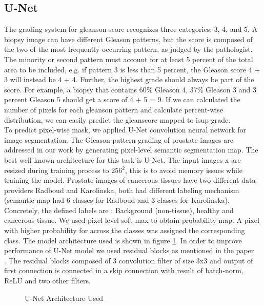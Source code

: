 \documentclass[10pt,twocolumn,letterpaper]{article}
\begin{document}
\subsection{U-Net}
 The grading system for gleanson score recognizes three categories: 3, 4, and 5. A biopsy image can have different Gleason patterns, but the score is composed of the two of the most frequently occurring pattern, as judged by the pathologist. The minority or second pattern must account for at least 5 percent of the total area to be included, e.g. if pattern 3 is less than 5 percent, the Gleason score 4 + 3 will instead be 4 + 4. Further, the highest grade should always be part of the score. For example, a biopsy that contains 60\% Gleason 4, 37\% Gleason 3 and 3 percent Gleason 5 should get a score of 4 + 5 = 9. If we can calculated the number of pixels for each gleanson pattern and calculate percent-wise distribution, we can easily predict the gleanscore mapped to isup-grade. \\
 
To predict pixel-wise mask, we applied U-Net \cite{10.1007/978-3-319-24574-4_28} convolution neural network for image segmentation. The Gleason pattern grading of prostate images are addressed in our work by generating pixel-level semantic segmentation map. The best well known architecture for this task is U-Net. The input images x are resized during training process to $256{^2}$, this is to avoid memory issues while training the model. Prostate images of cancerous tissues have two different data providers Radboud and Karolinska, both had different labeling mechanism (semantic map had 6 classes for Radboud and 3 classes for Karolinska). Concretely, the defined labels are : Background (non-tissue), healthy and cancerous tissue. We used pixel level soft-max to obtain probability map. A pixel with higher probability for across the classes was assigned the corresponding class. The model architecture used is shown in figure \ref{fig:unet}.
 In order to improve performance of U-Net model we used residual blocks as mentioned in the paper ~\cite{Amartya} . The residual blocks composed of 3 convolution filter of size 3x3 and output of first connection is connected in a skip connection with result of batch-norm, ReLU and two other filters.
 
\begin{figure}[t]
\begin{center}
\end{center}
   \caption{U-Net Architecture Used}
\label{fig:unet}
\end{figure}
\end{document}
